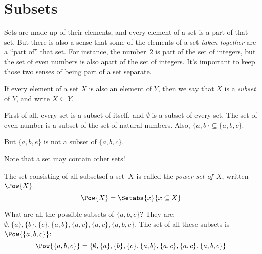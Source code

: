 \documentclass[open-logic-section]{subfiles}
\begin{document}
\section{Subsets}

\begin{wordy}
Sets are made up of their elements, and every element of a set is a
part of that set.  But there is also a sense that some of the elements
of a set \emph{taken together} are a ``part of'' that set. For
instance, the number~$2$ is part of the set of integers, but the set
of even numbers is also apart of the set of integers. It's important
to keep those two senses of being part of a set separate.
\end{wordy}

\begin{defn}
If every element of a set $X$ is also an element of
    $Y$, then we say that $X$ is a \emph{subset} of $Y$, and write $X
    \subseteq Y$.
\end{defn}

\begin{ex}
First of all, every set is a subset of itself, and $\emptyset$ is a
subset of every set. The set of even number is a subset of the set of
natural numbers.  Also, $\{ a, b \} \subseteq \{ a, b, c \}$.

But $\{ a, b, e \}$ is not a subset of $\{ a, b, c \}$.
\end{ex}

\begin{wordy}
Note that a set may contain other sets!  
\end{wordy}


\begin{defn}
The set consisting of all subsetsof a set~$X$ is called the
\emph{power set of}~$X$, written $\Pow{X}$.
    \[\Pow{X} = \Setabs{x}{x \subseteq X} \]
\end{defn}

\begin{ex}
What are all the possible subsets of $\{ a, b, c \}$? They are:
$\emptyset, \{a \}, \{b\}, \{c\}, \{a, b\}, \{a, c\}, \{a, c\}, \{a,
b, c\}$.  The set of all these subsets is $\Pow{\{a,b,c\}}$:
\[
\Pow{\{ a, b, c \}} = \{\emptyset, \{a \}, \{b\}, \{c\}, \{a, b\},
\{a, c\}, \{a, c\}, \{a, b, c\}\}
\]
\end{ex}
\end{document}
